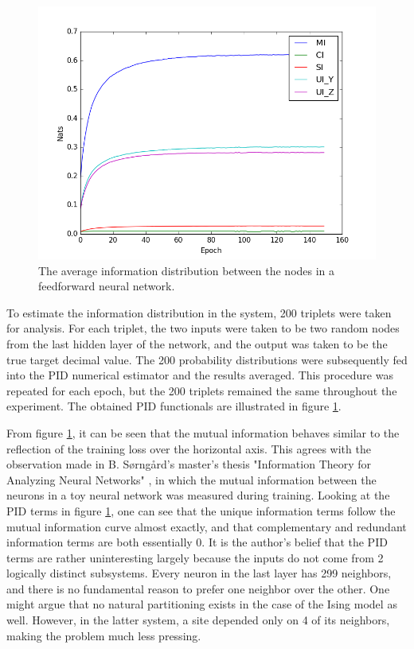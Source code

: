 \documentclass[12pt]{article}
\begin{document}
\begin{figure} [h]
\begin{center}
\includegraphics[width=.9\textwidth]{neural-net-pid}
\caption{The average information distribution between the nodes in a feedforward neural network.}
\label{fig:neural-net-pid}
\end{center}
\end{figure}

To estimate the information distribution in the system, 200 triplets were taken for analysis. For each triplet, the two inputs were taken to be two random nodes from the last hidden layer of the network, and the output was taken to be the true target decimal value. The 200 probability distributions were subsequently fed into the PID numerical estimator and the results averaged. This procedure was repeated for each epoch, but the 200 triplets remained the same throughout the experiment. The obtained PID functionals are illustrated in figure \ref{fig:neural-net-pid}.

From figure \ref{fig:neural-net-pid}, it can be seen that the mutual information behaves similar to the reflection of the training loss over the horizontal axis. This agrees with the observation made in B. Sørngård's master's thesis "Information Theory for Analyzing Neural Networks" \cite{it-neural-nets}, in which the mutual information between the neurons in a toy neural network was measured during training. Looking at the PID terms in figure \ref{fig:neural-net-pid}, one can see that the unique information terms follow the mutual information curve almost exactly, and that complementary and redundant information terms are both essentially 0. It is the author's belief that the PID terms are rather uninteresting largely because the inputs do not come from 2 logically distinct subsystems. Every neuron in the last layer has 299 neighbors, and there is no fundamental reason to prefer one neighbor over the other. One might argue that no natural partitioning exists in the case of the Ising model as well. However, in the latter system, a site depended only on 4 of its neighbors, making the problem much less pressing. 
\end{document}
